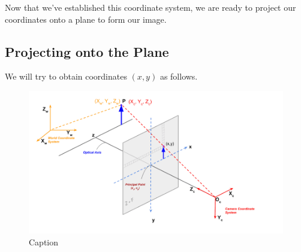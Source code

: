 \documentclass{article}
\begin{document}
Now that we've established this coordinate system, we are ready to project our coordinates onto a plane to form our image. 

\subsection{Projecting onto the Plane}
We will try to obtain coordinates $(x,y)$ as follows.

\begin{figure}[h]
    \centering
    \includegraphics[scale=0.4]{IMG_1110.png}
    \caption{Caption}
    \label{fig:enter-label}
\end{figure}
\end{document}
